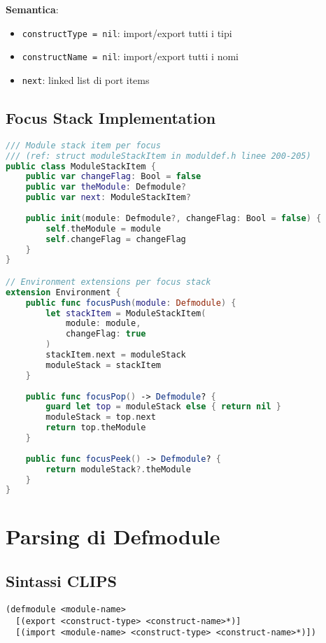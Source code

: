 \textbf{Semantica}:
\begin{itemize}
\item \texttt{constructType = nil}: import/export tutti i tipi
\item \texttt{constructName = nil}: import/export tutti i nomi
\item \texttt{next}: linked list di port items
\end{itemize}

\subsection{Focus Stack Implementation}

\begin{lstlisting}[language=Swift]
/// Module stack item per focus
/// (ref: struct moduleStackItem in moduldef.h linee 200-205)
public class ModuleStackItem {
    public var changeFlag: Bool = false
    public var theModule: Defmodule?
    public var next: ModuleStackItem?
    
    public init(module: Defmodule?, changeFlag: Bool = false) {
        self.theModule = module
        self.changeFlag = changeFlag
    }
}

// Environment extensions per focus stack
extension Environment {
    public func focusPush(module: Defmodule) {
        let stackItem = ModuleStackItem(
            module: module,
            changeFlag: true
        )
        stackItem.next = moduleStack
        moduleStack = stackItem
    }
    
    public func focusPop() -> Defmodule? {
        guard let top = moduleStack else { return nil }
        moduleStack = top.next
        return top.theModule
    }
    
    public func focusPeek() -> Defmodule? {
        return moduleStack?.theModule
    }
}
\end{lstlisting}

\section{Parsing di Defmodule}

\subsection{Sintassi CLIPS}

\begin{lstlisting}[language=CLIPS]
(defmodule <module-name>
  [(export <construct-type> <construct-name>*)]
  [(import <module-name> <construct-type> <construct-name>*)])
\end{lstlisting}

